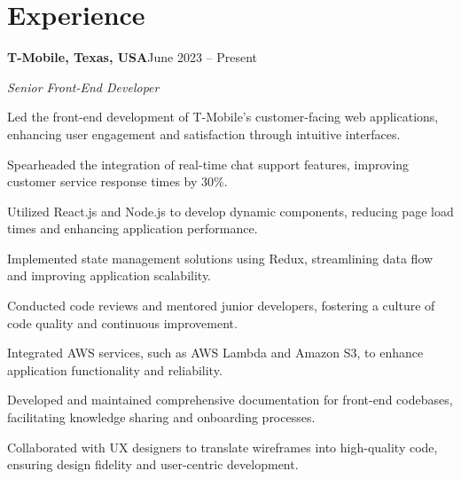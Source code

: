 \documentclass[11pt,a4paper]{article}
\newenvironment{resume_list}{%
  \begin{itemize}[leftmargin=1.5em, topsep=2pt, itemsep=0pt, parsep=0pt]
}{%
  \end{itemize}
}
\newcommand{\headingBf}[2]{%
  \textbf{#1}\hfill #2\par
}
\newcommand{\headingIt}[2]{%
  \textit{#1}\hfill #2\par
}
\begin{document}
\section*{Experience}

\headingBf{T-Mobile, Texas, USA}{June 2023 -- Present}
\headingIt{Senior Front-End Developer}{}
\begin{resume_list}
    \item Led the front-end development of T-Mobile's customer-facing web applications, enhancing user engagement and satisfaction through intuitive interfaces.
    \item Spearheaded the integration of real-time chat support features, improving customer service response times by 30\%.
    \item Utilized React.js and Node.js to develop dynamic components, reducing page load times and enhancing application performance.
    \item Implemented state management solutions using Redux, streamlining data flow and improving application scalability.
    \item Conducted code reviews and mentored junior developers, fostering a culture of code quality and continuous improvement.
    \item Integrated AWS services, such as AWS Lambda and Amazon S3, to enhance application functionality and reliability.
    \item Developed and maintained comprehensive documentation for front-end codebases, facilitating knowledge sharing and onboarding processes.
    \item Collaborated with UX designers to translate wireframes into high-quality code, ensuring design fidelity and user-centric development.
\end{resume_list}
\end{document}
